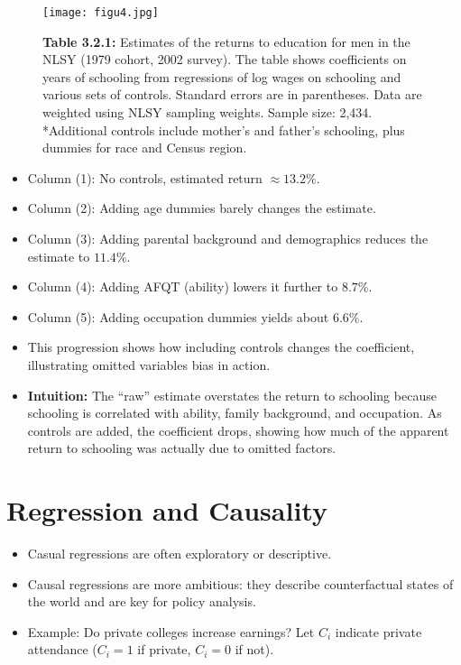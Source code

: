 \documentclass[12pt]{article}
\begin{document}
\begin{figure}[H]
    \centering
    \texttt{[image: figu4.jpg]}
    \caption*{\textbf{Table 3.2.1:} Estimates of the returns to education for men in the NLSY (1979 cohort, 2002 survey).  
    The table shows coefficients on years of schooling from regressions of log wages on schooling and various sets of controls.  
    Standard errors are in parentheses. Data are weighted using NLSY sampling weights. Sample size: 2,434.  
    *Additional controls include mother’s and father’s schooling, plus dummies for race and Census region.}
\end{figure}

\begin{itemize}
    \item Column (1): No controls, estimated return $\approx 13.2\%$.  
    \item Column (2): Adding age dummies barely changes the estimate.  
    \item Column (3): Adding parental background and demographics reduces the estimate to $11.4\%$.  
    \item Column (4): Adding AFQT (ability) lowers it further to $8.7\%$.  
    \item Column (5): Adding occupation dummies yields about $6.6\%$.  
    \item This progression shows how including controls changes the coefficient, illustrating omitted variables bias in action.  
    \item \textbf{Intuition:} The “raw” estimate overstates the return to schooling because schooling is correlated with ability, family background, and occupation. As controls are added, the coefficient drops, showing how much of the apparent return to schooling was actually due to omitted factors.
\end{itemize}

\section*{\noindent\textbf{Regression and Causality}}

\begin{itemize}
    \item Casual regressions are often exploratory or descriptive.  
    \item Causal regressions are more ambitious: they describe counterfactual states of the world and are key for policy analysis.  
    \item Example: Do private colleges increase earnings?  
          Let $C_i$ indicate private attendance ($C_i=1$ if private, $C_i=0$ if not).  
\end{itemize}
\end{document}
